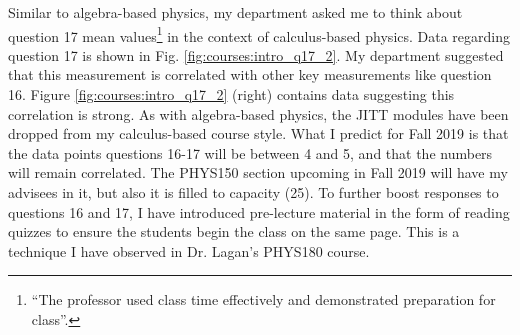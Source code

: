 \documentclass[../../main.tex]{subfiles}
\begin{document}
Similar to algebra-based physics, my department asked me to think about question 17 mean values\footnote{``The professor used class time effectively and demonstrated preparation for class''.} in the context of calculus-based physics.  Data regarding question 17 is shown in Fig. \ref{fig:courses:intro_q17_2}.  My department suggested that this measurement is correlated with other key measurements like question 16.  Figure \ref{fig:courses:intro_q17_2} (right) contains data suggesting this correlation is strong.  As with algebra-based physics, the JITT modules have been dropped from my calculus-based course style.  What I predict for Fall 2019 is that the data points questions 16-17 will be between 4 and 5, and that the numbers will remain correlated.  The PHYS150 section upcoming in Fall 2019 will have my advisees in it, but also it is filled to capacity (25).  To further boost responses to questions 16 and 17, I have introduced pre-lecture material in the form of reading quizzes to ensure the students begin the class on the same page.  This is a technique I have observed in Dr. Lagan's PHYS180 course.  \\ \hspace{0.1cm}
\end{document}
